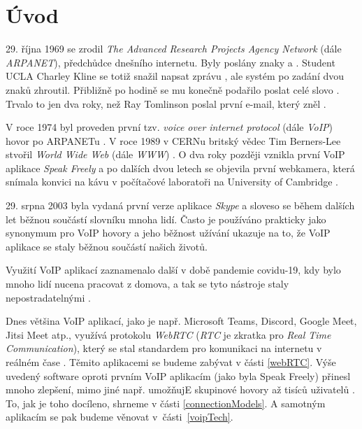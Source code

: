 \section{Úvod}

29. října 1969 se zrodil \textit{The Advanced Research Projects Agency Network}
(dále \textit{ARPANET}), předchůdce dnešního internetu. Byly poslány znaky
 a . Student UCLA Charley Kline se totiž snažil napsat zprávu
, ale systém po zadání dvou znaků zhroutil. Přibližně po hodině se mu
konečně podařilo poslat celé slovo
\cite{PBS-SimpleHelloFirstMessageOverARPANET}. Trvalo to jen dva roky, než Ray
Tomlinson poslal první e-mail, který zněl 
\cite{YahooFinance-SimpleHelloFirstMessageOverARPANET}.

V roce 1974 byl proveden první tzv. \textit{voice over internet protocol} (dále
\textit{VoIP}) hovor po ARPANETu
\cite{DigiFone-WhatYouMightNotKnowAboutTheHistoryOfVoIP}. V roce 1989 v CERNu
britský vědec Tim Berners-Lee stvořil \textit{World Wide Web} (dále
\textit{WWW}) \cite{CERN-TheBirthOfTheWeb}. O dva roky později vznikla první
VoIP aplikace \textit{Speak Freely}
\cite{DigiFone-WhatYouMightNotKnowAboutTheHistoryOfVoIP} a po dalších dvou
letech se objevila první webkamera, která snímala konvici na kávu v počítačové
laboratoři na University of Cambridge \cite{BBC-FirstWebcamMadeCoffeePotFamous}.

29. srpna 2003 byla vydaná první verze aplikace \textit{Skype}
\cite{ArsTechnica-TheStrangeStoryOfSkype} a sloveso  se během
dalších let běžnou součástí slovníku mnoha lidí. Často je používáno prakticky
jako synonymum pro VoIP hovory a jeho běžnost užívání ukazuje na to, že VoIP
aplikace se staly běžnou součástí našich životů.

Využití VoIP aplikací zaznamenalo další  v době pandemie covidu-19, kdy
bylo mnoho lidí nucena pracovat z domova, a tak se tyto nástroje staly
nepostradatelnými \cite{OnSIP-VoIPStatsTrendsCovidImpact}.

Dnes většina VoIP aplikací, jako je např. Microsoft Teams, Discord, Google Meet,
Jitsi Meet atp., využívá protokolu \textit{WebRTC} (\textit{RTC} je zkratka pro
\textit{Real Time Communication}), který se stal standardem pro komunikaci na
internetu v reálném čase \cite{LevelUp-WhatPowerMeetAndTeams,
Discord-HowDoesItHandleMillionsOfUsers, Jitsi-Projects, WebRTCORG-Homepage}.
Těmito aplikacemi se budeme zabývat v části \ref{webRTC}. Výše uvedený software
oproti prvním VoIP aplikacím (jako byla Speak Freely) přinesl mnoho zlepšení,
mimo jiné např. umožňujE skupinové hovory až tisíců uživatelů
\cite{MicrosoftLearn-MSTeamsLimitsAndSpecs}. To, jak je toho docíleno, shrneme v
části \ref{connectionModels}. A samotným aplikacím se pak budeme věnovat
v~části~\ref{voipTech}.

